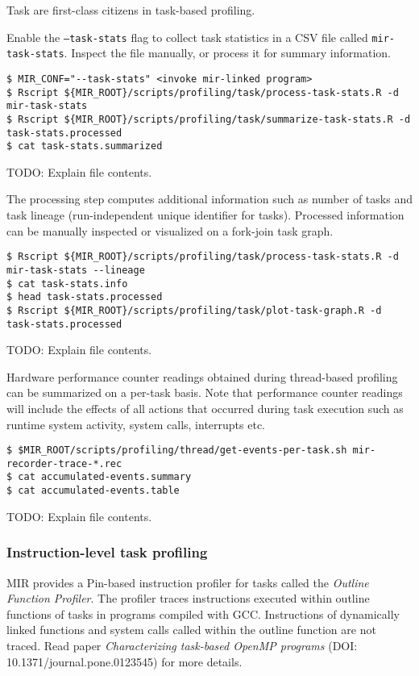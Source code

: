 \documentclass[11pt,a4paper]{article}
\begin{document}
Task are first-class citizens in task-based profiling.

Enable the \texttt{--task-stats} flag to collect task statistics in a CSV file called \texttt{mir-task-stats}. Inspect the file manually, or process it for summary information.

\begin{lstlisting}[style=MyInputStyle]
$ MIR_CONF="--task-stats" <invoke mir-linked program>
$ Rscript ${MIR_ROOT}/scripts/profiling/task/process-task-stats.R -d mir-task-stats
$ Rscript ${MIR_ROOT}/scripts/profiling/task/summarize-task-stats.R -d task-stats.processed
$ cat task-stats.summarized
\end{lstlisting}

TODO: Explain file contents.

The processing step computes additional information such as number of tasks and task lineage (run-independent unique identifier for tasks). Processed information can be manually inspected or visualized on a fork-join task graph.

\begin{lstlisting}[style=MyInputStyle]
$ Rscript ${MIR_ROOT}/scripts/profiling/task/process-task-stats.R -d mir-task-stats --lineage
$ cat task-stats.info
$ head task-stats.processed
$ Rscript ${MIR_ROOT}/scripts/profiling/task/plot-task-graph.R -d task-stats.processed
\end{lstlisting}

TODO: Explain file contents.

Hardware performance counter readings obtained during thread-based profiling can be summarized on a per-task basis. Note that performance counter readings will include the effects of all actions that occurred during task execution such as runtime system activity, system calls, interrupts etc.

\begin{lstlisting}[style=MyInputStyle]
$ $MIR_ROOT/scripts/profiling/thread/get-events-per-task.sh mir-recorder-trace-*.rec
$ cat accumulated-events.summary
$ cat accumulated-events.table
\end{lstlisting}

TODO: Explain file contents.

\subsubsection{Instruction-level task profiling}\label{instruction-level-task-profiling}

MIR provides a Pin-based instruction profiler for tasks called the \textit{Outline Function Profiler}.
The profiler traces instructions executed within outline functions of tasks in programs compiled with GCC. Instructions of dynamically linked functions and system calls called within the outline function are not traced. Read paper \textit{Characterizing task-based OpenMP programs} (DOI: 10.1371/journal.pone.0123545) for more details.
\end{document}

